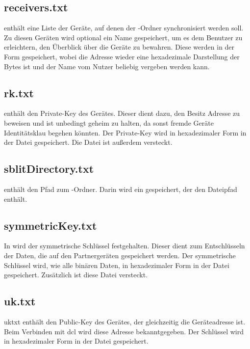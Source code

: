\subsection{receivers.txt} \label{receiverstxt}
 enthält eine Liste der Geräte, auf denen der \sblit-Ordner synchronisiert werden soll. Zu diesen Geräten wird optional ein Name gespeichert, um es dem Benutzer zu erleichtern, den Überblick über die Geräte zu bewahren. Diese werden in der Form  gespeichert, wobei die Adresse wieder eine hexadezimale Darstellung der Bytes ist und der Name vom Nutzer beliebig vergeben werden kann.

\subsection{rk.txt} \label{rktxt}
 enthält den Private-Key des Gerätes. Dieser dient dazu, den Besitz Adresse zu beweisen und ist unbedingt geheim zu halten, da sonst fremde Geräte Identitätsklau begehen könnten. Der Private-Key wird in hexadezimaler Form in der Datei gespeichert. Die Datei ist außerdem versteckt.

\subsection{sblitDirectory.txt} \label{sblitDirectorytxt}
 enthält den Pfad zum \sblit-Ordner. Darin wird ein  gespeichert, der den Dateipfad enthält. 

\subsection{symmetricKey.txt} \label{symmetricKeytxt}
In  wird der symmetrische Schlüssel festgehalten. Dieser dient zum Entschlüsseln der Daten, die auf den Partnergeräten gespeichert werden. Der symmetrische Schlüssel wird, wie alle binären Daten, in hexadezimaler Form in der Datei gespeichert. Zusätzlich ist diese Datei versteckt.

\subsection{uk.txt} {uktxt}
 enthält den Public-Key des Gerätes, der gleichzeitig die Geräteadresse ist. Beim Verbinden mit \gls{dcl} wird diese Adresse bekanntgegeben. Der Schlüssel wird in hexadezimaler Form in der Datei gespeichert.
